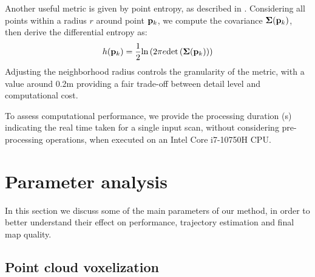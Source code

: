 \newcommand{\pk}{\vecx{p}_k}
Another useful metric is given by point entropy, as described in \cite{adolfsson2021coral}. Considering all points within a radius $r$ around point $\pk$, we compute the covariance $\matx{\Sigma}(\pk)$, then derive the differential entropy as:
\begin{equation}
    h(\pk) = \frac{1}{2}\text{ln}\left(
    2\pi e \text{det}\left(\matx{\Sigma}(\pk)\right)
    \right)
    \label{eq:entropy}
\end{equation}
Adjusting the neighborhood radius controls the granularity of the metric, with a value around 0.2m providing a fair trade-off between detail level and computational cost.

To assess computational performance, we provide the processing duration (s) indicating the real time taken for a single input scan, without considering pre-processing operations, when executed on an Intel Core i7-10750H CPU.





\section{Parameter analysis}

In this section we discuss some of the main parameters of our method, in order to better understand their effect on performance, trajectory estimation and final map quality.

\subsection{Point cloud voxelization}

